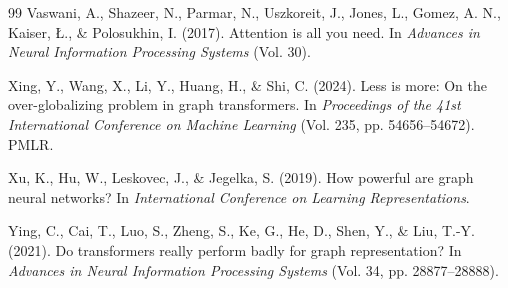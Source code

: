 \begin{thebibliography}{99}
Vaswani, A., Shazeer, N., Parmar, N., Uszkoreit, J., Jones, L., Gomez, A. N., Kaiser, \L{}., \& Polosukhin, I. (2017). Attention is all you need. In \emph{Advances in Neural Information Processing Systems} (Vol. 30).

Xing, Y., Wang, X., Li, Y., Huang, H., \& Shi, C. (2024). Less is more: On the over-globalizing problem in graph transformers. In \emph{Proceedings of the 41st International Conference on Machine Learning} (Vol. 235, pp. 54656--54672). PMLR.

Xu, K., Hu, W., Leskovec, J., \& Jegelka, S. (2019). How powerful are graph neural networks? In \emph{International Conference on Learning Representations}.

Ying, C., Cai, T., Luo, S., Zheng, S., Ke, G., He, D., Shen, Y., \& Liu, T.-Y. (2021). Do transformers really perform badly for graph representation? In \emph{Advances in Neural Information Processing Systems} (Vol. 34, pp. 28877--28888).


\end{thebibliography}
